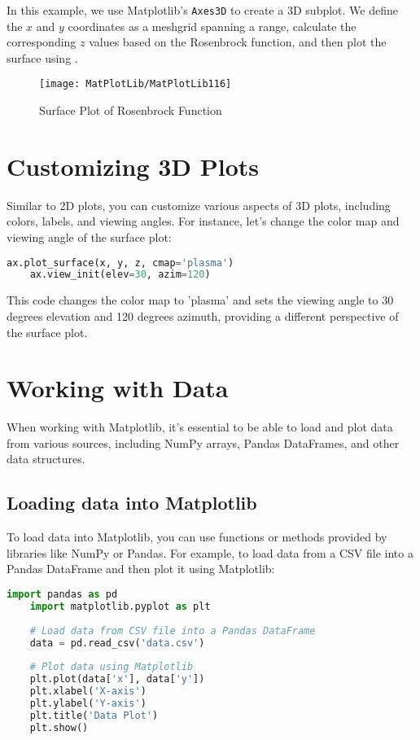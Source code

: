 In this example, we use Matplotlib's \texttt{Axes3D} to create a 3D subplot. We define the \(x\) and \(y\) coordinates as a meshgrid spanning a range, calculate the corresponding \(z\) values based on the Rosenbrock function, and then plot the surface using .

\begin{figure}[h]
	\centering
	\texttt{[image: MatPlotLib/MatPlotLib116]}
	\caption{Surface Plot of Rosenbrock Function}\label{Matplotlib116}
\end{figure}

\section*{Customizing 3D Plots}

Similar to 2D plots, you can customize various aspects of 3D plots, including colors, labels, and viewing angles. For instance, let's change the color map and viewing angle of the surface plot:

\begin{lstlisting}[language=Python]
	ax.plot_surface(x, y, z, cmap='plasma')
	ax.view_init(elev=30, azim=120)
\end{lstlisting}

This code changes the color map to 'plasma' and sets the viewing angle to 30 degrees elevation and 120 degrees azimuth, providing a different perspective of the surface plot.

\section{Working with Data}

When working with Matplotlib, it's essential to be able to load and plot data from various sources, including NumPy arrays, Pandas DataFrames, and other data structures.

\subsection*{Loading data into Matplotlib}

To load data into Matplotlib, you can use functions or methods provided by libraries like NumPy or Pandas. For example, to load data from a CSV file into a Pandas DataFrame and then plot it using Matplotlib:

\begin{lstlisting}[language=Python, caption={Loading and plotting data using Pandas}]
	import pandas as pd
	import matplotlib.pyplot as plt
	
	# Load data from CSV file into a Pandas DataFrame
	data = pd.read_csv('data.csv')
	
	# Plot data using Matplotlib
	plt.plot(data['x'], data['y'])
	plt.xlabel('X-axis')
	plt.ylabel('Y-axis')
	plt.title('Data Plot')
	plt.show()
\end{lstlisting}


